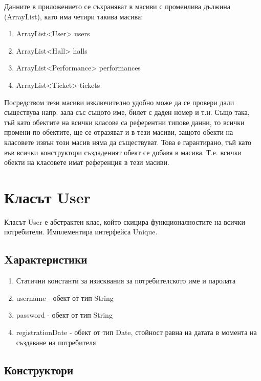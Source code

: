 \documentclass[12pt]{article}
\begin{document}
    Данните в приложението се съхраняват в масиви с променлива дължина (ArrayList), като има четири такива масива:

    \begin{enumerate}
        \item ArrayList<User> users
        \item ArrayList<Hall> halls
        \item ArrayList<Performance> performances
        \item ArrayList<Ticket> tickets
    \end{enumerate}

    Посредством тези масиви изключително удобно може да се провери дали съществува напр. зала със същото име, билет с даден номер и т.н. Също така, тъй като обектите на всички класове са референтни типове данни, то всички промени по обектите, ще се отразяват и в тези масиви, защото обекти на класовете извън този масив няма да съществуват. Това е гарантирано, тъй като във всички конструктори създаденият обект се добавя в масива. Т.е. всички обекти на класовете имат референция в тези масиви.

\section{Класът User}

    Класът User е абстрактен клас, който скицира функционалностите на всички потребители. Имплементира интерфейса Unique.

    \subsection{Xарактеристики}

        \begin{enumerate}
            \item Статични константи за изисквания за потребителското име и паролата
            \item username - обект от тип String
            \item password - обект от тип String
            \item registrationDate - обект от тип Date, стойност равна на датата в момента на създаване на потребителя
        \end{enumerate}

    \subsection{Конструктори}
\end{document}
